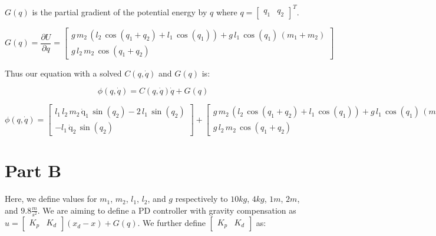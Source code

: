 \documentclass{article}
\begin{document}
$G(q)$ is the partial gradient of the potential energy by $q$ where $q=\begin{bmatrix} q_1 & q_2 \end{bmatrix}^T$.

\begin{equation}
    G(q) = \frac{\partial U}{\partial q} = \begin{bmatrix}
        g\,m_2 \,{\left(l_2 \,\cos \left(q_1 +q_2 \right)+l_1 \,\cos \left(q_1 \right)\right)}+g\,l_1 \,\cos \left(q_1 \right)\,{\left(m_1 +m_2 \right)}\\
        g\,l_2 \,m_2 \,\cos \left(q_1 +q_2 \right)
        \end{bmatrix}
\end{equation}

Thus our equation with a solved $C(q, \dot{q})$ and $G(q)$ is:

\begin{equation}
    \phi(q, \dot{q}) = C(q, \dot{q})\dot{q} + G(q)
\end{equation}

\begin{equation}
    \phi(q, \dot{q}) = 
    \begin{bmatrix}
        l_1 \,l_2 \,m_2 \,\mathrm{\dot{q}_1}\,\sin \left(q_2 \right)-2\,l_1 \,\sin \left(q_2 \right)\\
        -l_1 \,\mathrm{\dot{q}_2}\,\sin \left(q_2 \right)
        \end{bmatrix}
    + \begin{bmatrix}
        g\,m_2 \,{\left(l_2 \,\cos \left(q_1 +q_2 \right)+l_1 \,\cos \left(q_1 \right)\right)}+g\,l_1 \,\cos \left(q_1 \right)\,{\left(m_1 +m_2 \right)}\\
        g\,l_2 \,m_2 \,\cos \left(q_1 +q_2 \right)
        \end{bmatrix}
\end{equation}

\section*{Part B}

Here, we define values for $m_1$, $m_2$, $l_1$, $l_2$, and $g$ respectively to $10kg$, $4kg$, $1m$, $2m$, and $9.8\frac{m}{s^2}$. We are aiming to define a PD controller with gravity compensation as $u = \begin{bmatrix} K_p & K_d \end{bmatrix} (x_d-x)+G(q)$. We further define $\begin{bmatrix} K_p & K_d \end{bmatrix}$ as:
\end{document}
